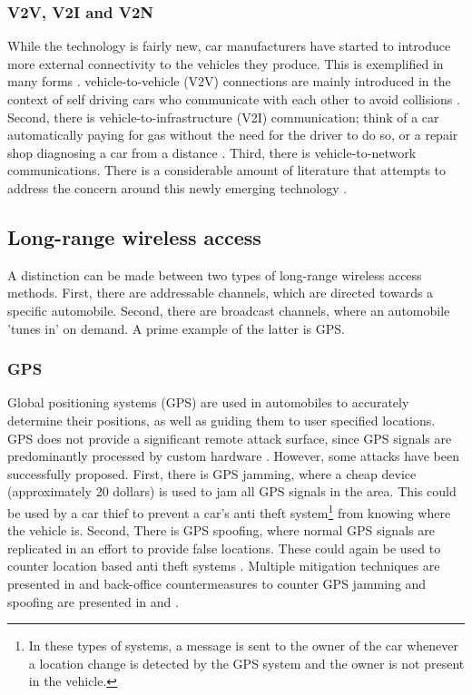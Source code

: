 \subsubsection{V2V, V2I and V2N} 
\label{subsubsec:v2v}

While the technology is fairly new, car manufacturers have started to introduce more external connectivity to the vehicles they produce. This is exemplified in many forms \cite{Ahmed}. vehicle-to-vehicle (V2V) connections are mainly introduced in the context of self driving cars who communicate with each other to avoid collisions \cite{Enisa}. Second, there is vehicle-to-infrastructure (V2I) communication; think of a car automatically paying for gas without the need for the driver to do so, or a repair shop diagnosing a car from a distance \cite{Kleberger}. Third, there is vehicle-to-network communications. There is a considerable amount of literature that attempts to address the concern around this newly emerging technology \cite{Kleberger15, Russel17, Maxim, Crispo}.

\subsection{Long-range wireless access}
\label{subsec:lone-range_wireless_access}

A distinction can be made between two types of long-range wireless access methods. First, there are addressable channels, which are directed towards a specific automobile. Second, there are broadcast channels, where an automobile 'tunes in' on demand. A prime example of the latter is GPS.

\subsubsection{GPS} 
\label{subsubsec:gps}

Global positioning systems (GPS) are used in automobiles to accurately determine their positions, as well as guiding them to user specified locations. GPS does not provide a significant remote attack surface, since GPS signals are predominantly processed by custom hardware \cite{Kosher}. However, some attacks have been successfully proposed. First, there is GPS jamming, where a cheap device (approximately 20 dollars) is used to jam all GPS signals in the area. This could be used by a car thief to prevent a car's anti theft system\footnote{In these types  of systems, a message is sent to the owner of the car whenever a location change is detected by the GPS system and the owner is not present in the vehicle.} from knowing where the vehicle is. Second, There is GPS spoofing, where normal GPS signals are replicated in an effort to provide false locations. These could again be used to counter location based anti theft systems \cite{Petit}. Multiple mitigation techniques are presented in \cite{GPS1} and back-office countermeasures to counter GPS jamming and spoofing are presented in \cite{GPS2} and \cite{GPS3}. 

